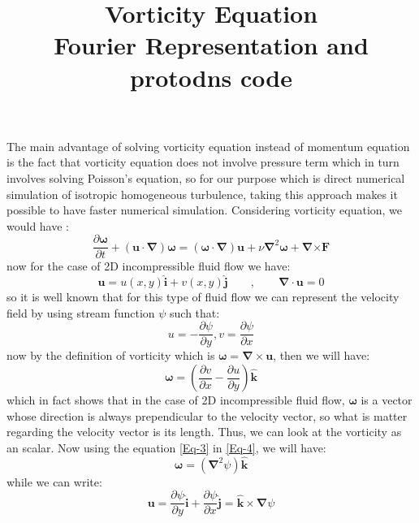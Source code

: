 \documentclass[10pt]{article}
\title{\huge{\textbf{Vorticity Equation \\ \vspace{1cm} Fourier Representation and protodns code}}}
\date{}
\begin{document}
\maketitle
The main advantage of solving vorticity equation instead of momentum equation is the fact that vorticity equation does not involve pressure term which in turn involves solving Poisson's equation, so for our purpose which is direct numerical simulation of isotropic homogeneous turbulence, taking this approach makes it possible to have faster numerical simulation. Considering vorticity equation, we would have :
%
\begin{equation}\label{Vorticity}	
\frac{\partial{\bm{\omega}}}{\partial t} + (\bm{u}\cdot\bm{\nabla})\bm{\omega}=(\bm{\omega}\cdot\bm{\nabla})\bm{u} + \nu\bm{\nabla}^2\bm{\omega} + \bm{\nabla}\bm{\times}\bm{F}
\end{equation}
%
now for the case of 2D incompressible fluid flow we have:
%
\begin{equation}
\bm{u}=u(x,y)\bm{\hat{i}}+v(x,y)\bm{\hat{j}}\qquad, \qquad \bm{\nabla}\cdot\bm{u}=0
\end{equation}
%
so it is well known that for this type of fluid flow we can represent the velocity field by using stream function $\psi$ such that:
%
\begin{equation}\label{Eq-3}
u=-\frac{\partial\psi}{\partial y}, v=\frac{\partial\psi}{\partial x}
\end{equation}
%
now by the definition of vorticity which is $\bm{\omega}=\bm{\nabla}\times\bm{u}$, then we will have:
%
\begin{equation}\label{Eq-4}
\bm{\omega}=(\frac{\partial v}{\partial x}-\frac{\partial u}{\partial y})\bm{\hat{k}}
\end{equation}
%
which in fact shows that in the case of 2D incompressible fluid flow, $\bm{\omega}$ is a vector whose direction is always prependicular to the velocity vector, so what is matter regarding the velocity vector is its length. Thus, we can look at the vorticity as an scalar. Now using the equation \eqref{Eq-3} in \eqref{Eq-4}, we will have:
%
\begin{equation}\label{Eq-5}
\bm{\omega}=({\bm{\nabla}}^2\psi)\bm{\hat{k}}
\end{equation}
%
while we can write:
%
\begin{equation}\label{Eq-6}
\bm{u}=\frac{\partial\psi}{\partial y}\bm{\hat{i}}+\frac{\partial\psi}{\partial x}\bm{\hat{j}}=\bm{\hat{k}}\times\bm{\nabla}\psi
\end{equation}
\end{document}
